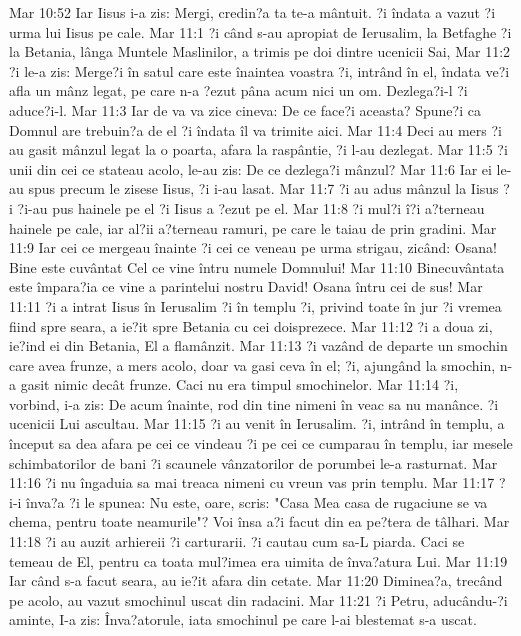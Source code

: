 Mar 10:52  Iar Iisus i-a zis: Mergi, credin?a ta te-a mântuit. ?i îndata a vazut ?i urma lui Iisus pe cale.
Mar 11:1  ?i când s-au apropiat de Ierusalim, la Betfaghe ?i la Betania, lânga Muntele Maslinilor, a trimis pe doi dintre ucenicii Sai,
Mar 11:2  ?i le-a zis: Merge?i în satul care este înaintea voastra ?i, intrând în el, îndata ve?i afla un mânz legat, pe care n-a ?ezut pâna acum nici un om. Dezlega?i-l ?i aduce?i-l.
Mar 11:3  Iar de va va zice cineva: De ce face?i aceasta? Spune?i ca Domnul are trebuin?a de el ?i îndata îl va trimite aici.
Mar 11:4  Deci au mers ?i au gasit mânzul legat la o poarta, afara la raspântie, ?i l-au dezlegat.
Mar 11:5  ?i unii din cei ce stateau acolo, le-au zis: De ce dezlega?i mânzul?
Mar 11:6  Iar ei le-au spus precum le zisese Iisus, ?i i-au lasat.
Mar 11:7  ?i au adus mânzul la Iisus ?i ?i-au pus hainele pe el ?i Iisus a ?ezut pe el.
Mar 11:8  ?i mul?i î?i a?terneau hainele pe cale, iar al?ii a?terneau ramuri, pe care le taiau de prin gradini.
Mar 11:9  Iar cei ce mergeau înainte ?i cei ce veneau pe urma strigau, zicând: Osana! Bine este cuvântat Cel ce vine întru numele Domnului!
Mar 11:10  Binecuvântata este împara?ia ce vine a parintelui nostru David! Osana întru cei de sus!
Mar 11:11  ?i a intrat Iisus în Ierusalim ?i în templu ?i, privind toate în jur ?i vremea fiind spre seara, a ie?it spre Betania cu cei doisprezece.
Mar 11:12  ?i a doua zi, ie?ind ei din Betania, El a flamânzit.
Mar 11:13  ?i vazând de departe un smochin care avea frunze, a mers acolo, doar va gasi ceva în el; ?i, ajungând la smochin, n-a gasit nimic decât frunze. Caci nu era timpul smochinelor.
Mar 11:14  ?i, vorbind, i-a zis: De acum înainte, rod din tine nimeni în veac sa nu manânce. ?i ucenicii Lui ascultau.
Mar 11:15  ?i au venit în Ierusalim. ?i, intrând în templu, a început sa dea afara pe cei ce vindeau ?i pe cei ce cumparau în templu, iar mesele schimbatorilor de bani ?i scaunele vânzatorilor de porumbei le-a rasturnat.
Mar 11:16  ?i nu îngaduia sa mai treaca nimeni cu vreun vas prin templu.
Mar 11:17  ?i-i înva?a ?i le spunea: Nu este, oare, scris: "Casa Mea casa de rugaciune se va chema, pentru toate neamurile"? Voi însa a?i facut din ea pe?tera de tâlhari.
Mar 11:18  ?i au auzit arhiereii ?i carturarii. ?i cautau cum sa-L piarda. Caci se temeau de El, pentru ca toata mul?imea era uimita de înva?atura Lui.
Mar 11:19  Iar când s-a facut seara, au ie?it afara din cetate.
Mar 11:20  Diminea?a, trecând pe acolo, au vazut smochinul uscat din radacini.
Mar 11:21  ?i Petru, aducându-?i aminte, I-a zis: Înva?atorule, iata smochinul pe care l-ai blestemat s-a uscat.
